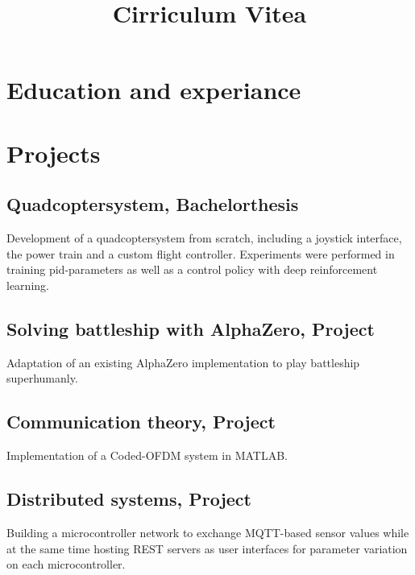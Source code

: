 \documentclass[10pt, a4paper, sans]{moderncv}
\title{Cirriculum Vitea}
\begin{document}

\makecvtitle

\vspace{-1cm}

\section{Education and experiance}

\section{Projects}
\subsection*{Quadcoptersystem, Bachelorthesis}
Development of a quadcoptersystem from scratch, including a joystick interface, the power train and a custom flight controller. Experiments were performed in training pid-parameters as well as a control policy with deep reinforcement learning.
\subsection*{Solving battleship with AlphaZero, Project}
Adaptation of an existing AlphaZero implementation to play battleship superhumanly.
\subsection{Communication theory, Project}
Implementation of a Coded-OFDM system in MATLAB.
\subsection{Distributed systems, Project}
Building a microcontroller network to exchange MQTT-based sensor values while at the same time hosting REST servers as user interfaces for parameter variation on each microcontroller.
\end{document}
